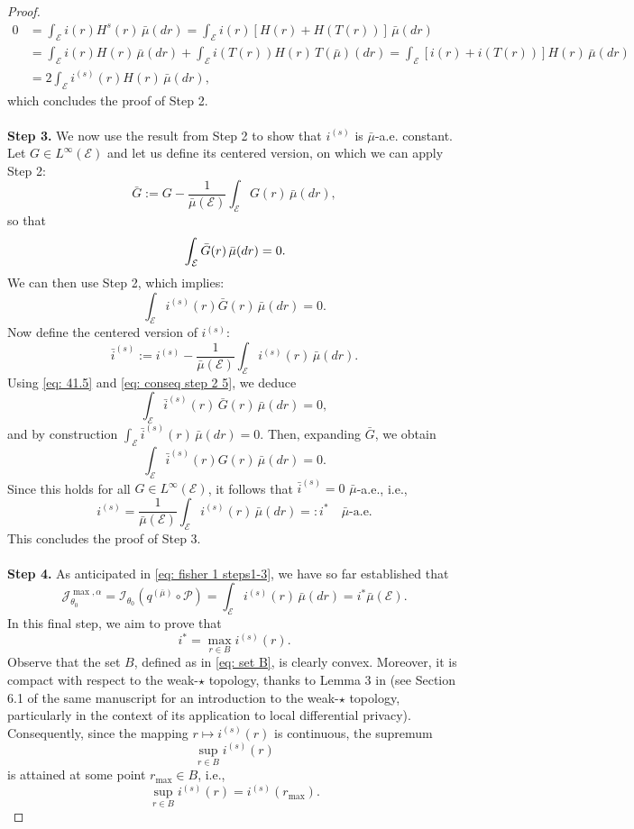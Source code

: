 \documentclass[a4paper, 11pt]{article}
\theoremstyle{definition}
\begin{document}
{\begin{proof}
\begin{align*}
0 &= \int_\mathcal{E} i(r) H^s(r)\, \bar{\mu}(dr) = \int_\mathcal{E} i(r) \left[ H(r) + H(T(r)) \right]\, \bar{\mu}(dr) \\
&= \int_\mathcal{E} i(r) H(r)\, \bar{\mu}(dr) + \int_\mathcal{E} i(T(r)) H(r)\, T(\bar{\mu})(dr) = \int_\mathcal{E} \left[ i(r) + i(T(r)) \right] H(r)\, \bar{\mu}(dr) \\
&= 2 \int_\mathcal{E} i^{(s)}(r) H(r)\, \bar{\mu}(dr),
\end{align*}
which concludes the proof of Step 2.\\
\\
\textbf{Step 3.} We now use the result from Step 2 to show that $i^{(s)}$ is $\bar{\mu}$-a.e. constant. Let $G \in L^\infty(\mathcal{E})$ and let us define its centered version, on which we can apply Step 2:
\[
\bar{G} := G - \frac{1}{\bar{\mu}(\mathcal{E})} \int_\mathcal{E} G(r)\, \bar{\mu}(dr),
\]
so that 
\begin{equation}{\label{eq: 41.5}}
 \int_\mathcal{E} \bar{G}(r)\, \bar{\mu}(dr) = 0.  
\end{equation}
We can then use Step 2, which implies:
\begin{equation} \label{eq: conseq step 2 5}
\int_\mathcal{E} i^{(s)}(r) \bar{G}(r)\, \bar{\mu}(dr) = 0.
\end{equation}
Now define the centered version of $i^{(s)}$:
\[
\bar{i}^{(s)} := i^{(s)} - \frac{1}{\bar{\mu}(\mathcal{E})} \int_\mathcal{E} i^{(s)}(r)\, \bar{\mu}(dr).
\]
Using \eqref{eq: 41.5} and \eqref{eq: conseq step 2 5}, we deduce
\[
\int_\mathcal{E} \bar{i}^{(s)}(r)\, \bar{G}(r)\, \bar{\mu}(dr) = 0,
\]
and by construction $\int_\mathcal{E} \bar{i}^{(s)}(r)\, \bar{\mu}(dr) = 0$. Then, expanding $\bar{G}$, we obtain
\[
\int_\mathcal{E} \bar{i}^{(s)}(r) G(r)\, \bar{\mu}(dr) = 0.
\]
Since this holds for all $G \in L^\infty(\mathcal{E})$, it follows that $\bar{i}^{(s)} = 0$ $\bar{\mu}$-a.e., i.e.,
\[
i^{(s)} = \frac{1}{\bar{\mu}(\mathcal{E})} \int_\mathcal{E} i^{(s)}(r)\, \bar{\mu}(dr)=: i^* \quad \text{$\bar{\mu}$-a.e.}
\]
This concludes the proof of Step 3. \\
\\
\textbf{Step 4.} As anticipated in \eqref{eq: fisher 1 steps1-3}, we have so far established that
\[
\mathcal{J}_{\theta_0}^{\max, \alpha} = \mathcal{I}_{\theta_0}(q^{(\bar{\mu})} \circ \mathcal{P}) = \int_\mathcal{E} i^{(s)}(r) \, \bar{\mu}(dr) = i^{*} \bar{\mu} (\mathcal{E}).
\]
In this final step, we aim to prove that
\[
i^{*} = \max_{r \in B} i^{(s)}(r).
\]
Observe that the set \( B \), defined as in \eqref{eq: set B}, is clearly convex. Moreover, it is compact with respect to the weak-\(\star\) topology, thanks to Lemma 3 in \cite{amorino2025factorization} (see Section 6.1 of the same manuscript for an introduction to the weak-\(\star\) topology, particularly in the context of its application to local differential privacy). Consequently, since the mapping \( r \mapsto i^{(s)}(r) \) is continuous, the supremum
\[
\sup_{r \in B} i^{(s)}(r)
\]
is attained at some point \( r_{\max} \in B \), i.e.,
\[
\sup_{r \in B} i^{(s)}(r) = i^{(s)}(r_{\max}).
\]


\end{proof}}
\end{document}

